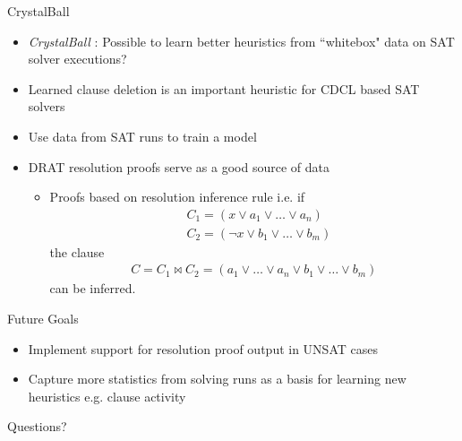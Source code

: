 \documentclass{beamer}
\begin{document}
\begin{frame}{CrystalBall}
    \begin{itemize}[<+->]
        \item \textit{CrystalBall} \cite{2019sooscrystalball}: Possible to learn better heuristics from ``whitebox" data on SAT solver executions? 
        \item Learned clause deletion is an important heuristic for CDCL based SAT solvers
        \item Use data from SAT runs to train a model
        \item DRAT resolution proofs serve as a good source of data
        \pause
        \begin{itemize}
            \item Proofs based on resolution inference rule i.e. if
            \begin{align*}
                &C_1 = (x \vee a_1 \vee \dots \vee a_n) \\
                &C_2 = (\neg{x} \vee b_1 \vee \dots \vee b_m)
            \end{align*}
            the clause 
            \begin{align*}
                C = C_1 \bowtie C_2 = (a_1 \vee \dots \vee a_n \vee b_1 \vee \dots \vee b_m)
            \end{align*}
            can be inferred.
        \end{itemize}
    \end{itemize}
\end{frame}

\begin{frame}{Future Goals}
    \begin{itemize}[<+->]
        \item Implement support for resolution proof output in UNSAT cases
        \item Capture more statistics from solving runs as a basis for learning new heuristics e.g. clause activity
    \end{itemize}
\end{frame}

\begin{frame}{}
    \begin{center}
        \Large
        Questions?
    \end{center}
\end{frame}



\end{document}
